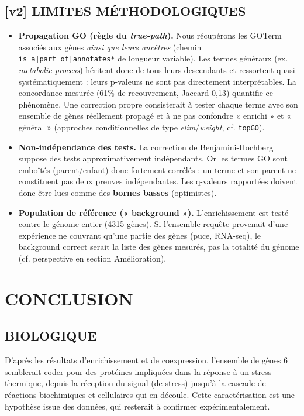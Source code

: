 \documentclass[a4paper,11pt,openright]{report}
\begin{document}
\section{[v2] LIMITES MÉTHODOLOGIQUES}
\label{sec:limites}
\begin{itemize}
\item \textbf{Propagation GO (règle du \textit{true-path}).} Nous récupérons les GOTerm associés aux gènes \textit{ainsi que leurs ancêtres} (chemin \texttt{is\_a|part\_of|annotates*} de longueur variable). Les termes généraux (ex. \textit{metabolic process}) héritent donc de tous leurs descendants et ressortent quasi systématiquement : leurs p-valeurs ne sont pas directement interprétables. La concordance mesurée (61\% de recouvrement, Jaccard 0,13) quantifie ce phénomène. Une correction propre consisterait à tester chaque terme avec son ensemble de gènes réellement propagé et à ne pas confondre « enrichi » et « général » (approches conditionnelles de type \textit{elim}/\textit{weight}, cf. \texttt{topGO}).
\item \textbf{Non-indépendance des tests.} La correction de Benjamini-Hochberg suppose des tests approximativement indépendants. Or les termes GO sont emboîtés (parent/enfant) donc fortement corrélés : un terme et son parent ne constituent pas deux preuves indépendantes. Les q-valeurs rapportées doivent donc être lues comme des \textbf{bornes basses} (optimistes).
\item \textbf{Population de référence (« background »).} L'enrichissement est testé contre le génome entier (4315 gènes). Si l'ensemble requête provenait d'une expérience ne couvrant qu'une partie des gènes (puce, RNA-seq), le background correct serait la liste des gènes mesurés, pas la totalité du génome (cf. perspective en section Amélioration).
\end{itemize}








\chapter{CONCLUSION}
\thispagestyle{empty}
\clearpage
\newpage
\section{BIOLOGIQUE}
D'après les résultats d'enrichissement et de coexpression, l'ensemble de gènes 6 semblerait coder pour des protéines impliquées dans la réponse à un stress thermique, depuis la réception du signal (de stress) jusqu'à la cascade de réactions biochimiques et cellulaires qui en découle. Cette caractérisation est une hypothèse issue des données, qui resterait à confirmer expérimentalement. 
\end{document}
